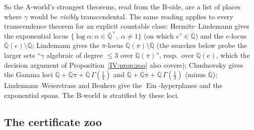 \documentclass[11pt,a4paper]{article}
\newcommand{\Q}{\mathbb Q}
\newcommand{\Qbar}{\overline{\mathbb Q}}
\newcommand{\Ein}{\operatorname{Ein}}
\theoremstyle{definition}
\theoremstyle{remark}
\numberwithin{equation}{section}
\begin{document}
So the $\mathrm A$-world's strongest theorems, read from the $\mathrm B$-side, are a list
of places where $\gamma$ would be \emph{visibly} transcendental. The same reading applies
to every transcendence theorem for an explicit countable class: Hermite--Lindemann gives
the exponential locus $\{\log\alpha:\alpha\in\Qbar^\times,\ \alpha\ne1\}$ (on which
$e^\gamma\in\Qbar$) and the $e$-locus $\Qbar(e)\setminus\Qbar$; Lindemann gives the $\pi$-locus
$\Qbar(\pi)\setminus\Qbar$ (the searches below probe the larger sets ``$\gamma$ algebraic of
degree $\le3$ over $\Q(\pi)$'', resp.\ over $\Q(e)$, which the decision argument of
Proposition~\ref{IV:prop:zoo} also covers); Chudnovsky gives the Gamma loci
$\Qbar+\Qbar\pi+\Qbar\,\Gamma(\tfrac14)$ and $\Qbar+\Qbar\pi+\Qbar\,\Gamma(\tfrac13)$ (minus
$\Qbar$); Lindemann--Weierstrass and Beukers give the $\Ein$-hyperplanes and the
exponential spans. The $\mathrm B$-world is stratified by these loci.

\subsection{The certificate zoo}
\end{document}
